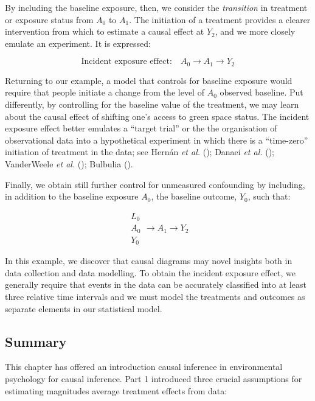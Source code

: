 \documentclass[
  singlecolumn]{article}
\begin{document}
By including the baseline exposure, then, we consider the
\emph{transition} in treatment or exposure status from \(A_0\) to
\(A_1\). The initiation of a treatment provides a clearer intervention
from which to estimate a causal effect at \(Y_2\), and we more closely
emulate an experiment. It is expressed:

\[
\text{Incident exposure effect:} \quad \boxed{A_{0}} \to A_{1} \to Y_{2}
\]

Returning to our example, a model that controls for baseline exposure
would require that people initiate a change from the level of \(A_0\)
observed baseline. Put differently, by controlling for the baseline
value of the treatment, we may learn about the causal effect of shifting
one's access to green space status. The incident exposure effect better
emulates a ``target trial'' or the the organisation of observational
data into a hypothetical experiment in which there is a ``time-zero''
initiation of treatment in the data; see Hernán \emph{et al.}
(); Danaei \emph{et al.}
(); VanderWeele \emph{et al.}
(); Bulbulia
().

Finally, we obtain still further control for unmeasured confounding by
including, in addition to the baseline exposure \(A_0\), the baseline
outcome, \(Y_0\), such that:

\[
\boxed{
\begin{aligned}
L_{0} \\
A_{0} \\
Y_{0}
\end{aligned}
}
\to A_{1} \to Y_{2}
\]

In this example, we discover that causal diagrams may novel insights
both in data collection and data modelling. To obtain the incident
exposure effect, we generally require that events in the data can be
accurately classified into at least three relative time intervals and we
must model the treatments and outcomes as separate elements in our
statistical model.

\subsection{Summary}\label{summary}

This chapter has offered an introduction causal inference in
environmental psychology for causal inference. Part 1 introduced three
crucial assumptions for estimating magnitudes average treatment effects
from data:
\end{document}
